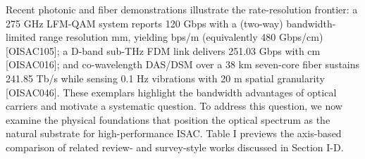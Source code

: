 {}Recent photonic and fiber demonstrations illustrate the rate-resolution frontier: a 275 GHz LFM-QAM system reports 120 Gbps with a (two-way) bandwidth-limited range resolution  mm, yielding  bps/m (equivalently 480 Gbps/cm) [O\markdownRendererUnderscore{}ISAC\markdownRendererUnderscore{}105]; a D-band sub-THz FDM link delivers 251.03 Gbps with  cm [O\markdownRendererUnderscore{}ISAC\markdownRendererUnderscore{}016]; and co-wavelength DAS/DSM over a 38 km seven-core fiber sustains 241.85 Tb/s while sensing 0.1 Hz vibrations with 20 m spatial granularity [O\markdownRendererUnderscore{}ISAC\markdownRendererUnderscore{}046]. These exemplars highlight the bandwidth advantages of optical carriers and motivate a systematic question.\markdownRendererParagraphSeparator
{} To address this question, we now examine the physical foundations that position the optical spectrum as the natural substrate for high-performance ISAC.\markdownRendererParagraphSeparator
{}Table I previews the axis-based comparison of related review- and survey-style works discussed in Section I-D.\markdownRendererParagraphSeparator
{}\markdownRendererInterblockSeparator
